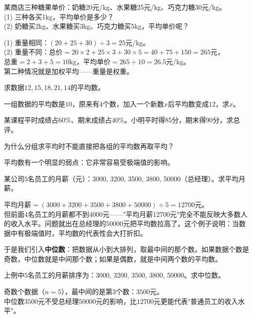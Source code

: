 \begin{example}
某商店三种糖果单价：奶糖20元/kg、水果糖25元/kg、巧克力糖30元/kg。\\
(1) 三种各买1kg，平均单价是多少？\\
(2) 奶糖买2kg、水果糖买3kg、巧克力糖买5kg，平均单价呢？
\end{example}
\begin{solution}
(1) 重量相同：$(20+25+30)\div3=25$元/kg。\\
(2) 重量不同：总价$=20\times2+25\times3+30\times5=40+75+150=265$元，\\
总重$=2+3+5=10$kg，平均单价$=265\div10=26.5$元/kg。\\
第二种情况就是加权平均——重量是权重。
\end{solution}

\begin{exercise}
\item 求数据$12,15,18,21,14$的平均数。
\item 一组数据的平均数是$10$，原来有$4$个数，加入一个新数$x$后平均数变成$12$，求$x$。
\item 某课程平时成绩占$60\%$、期末成绩占$40\%$。小明平时得85分，期末得90分，求总评。
\item 为什么分组求平均时不能直接把各组的平均数再取平均？
\end{exercise}


平均数有一个明显的弱点：它非常容易受极端值的影响。

\begin{example}
某公司$5$名员工的月薪（元）：3000, 3200, 3500, 3800, 50000（总经理）。求平均月薪。
\end{example}
\begin{solution}
平均月薪$=(3000+3200+3500+3800+50000)\div5=12700$元。\\
但前面$4$名员工的月薪都不到$4000$元——"平均月薪12700元"完全不能反映大多数人的收入水平。问题就出在总经理的$50000$元把平均数拉高了。这个例子说明：当数据中有极端值时，平均数的代表性会大打折扣。
\end{solution}

于是我们引入\textbf{中位数}：把数据从小到大排列，取最中间的那个数。如果数据个数是奇数，中位数就是中间那个数；如果是偶数，就是中间两个数的平均数。

\begin{example}
上例中$5$名员工的月薪排序为：3000, 3200, 3500, 3800, 50000。求中位数。
\end{example}
\begin{solution}
奇数个数据（$n=5$），最中间的是第$3$个数：$3500$元。\\
中位数$3500$元不受总经理$50000$元的影响，比$12700$元更能代表"普通员工的收入水平"。
\end{solution}

